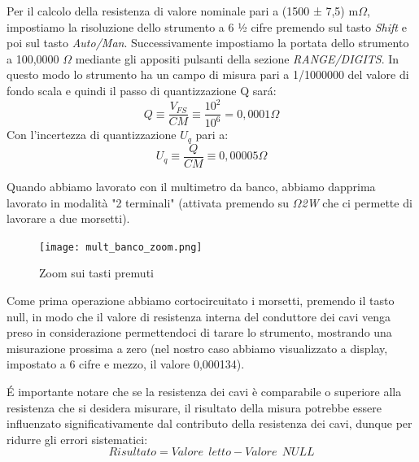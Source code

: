 Per il calcolo della resistenza di valore nominale pari a (1500 ± 7,5) m$\Omega$, impostiamo la risoluzione dello strumento a 6 ½ cifre premendo sul tasto \emph{Shift} e poi sul tasto \emph{Auto/Man}. Successivamente impostiamo la portata dello strumento a 100,0000 $\Omega$ mediante gli appositi pulsanti della sezione \emph{RANGE/DIGITS}. In questo modo lo strumento ha un campo di misura 
pari a 1/1000000 del valore di fondo scala e quindi il passo di quantizzazione Q sar\'a: 
\begin{equation}
    Q \equiv \frac{V_{FS}}{CM} \equiv \frac{10^2}{10^6} = 0,0001 \Omega
\end{equation}
Con l'incertezza di quantizzazione $U_q$ pari a:
\begin{equation}
    U_q \equiv \frac{Q}{CM} \equiv 0,00005 \Omega
\end{equation}

Quando abbiamo lavorato con il multimetro da banco, abbiamo dapprima lavorato in modalità "2 terminali" (attivata premendo su  \emph{$\Omega$2W} che ci permette di lavorare a due morsetti).

\begin{figure}[h]
    \centering
    \texttt{[image: mult\_banco\_zoom.png]}
    \caption{Zoom sui tasti premuti}
    \label{fig:mult_banco_zoom}
\end{figure}
\FloatBarrier

Come prima operazione abbiamo cortocircuitato i morsetti, premendo il tasto null, in modo che il valore di resistenza interna del conduttore dei cavi venga preso in considerazione permettendoci di tarare lo strumento, mostrando una misurazione prossima a zero (nel nostro caso abbiamo visualizzato a display, impostato a 6 cifre e mezzo, il valore 0,000134).


\'E importante notare che se la resistenza dei cavi è comparabile o superiore alla resistenza che si desidera misurare, il risultato della misura potrebbe essere influenzato significativamente dal contributo della resistenza dei cavi, dunque per ridurre gli errori sistematici:
\begin{equation}
    Risultato = Valore \ \ letto - Valore\ \ NULL
\end{equation}

